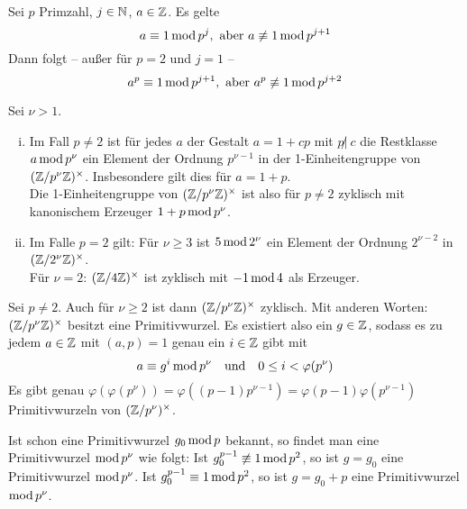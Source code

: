 \begin{lemma} \label{lemma_4.2}
	Sei $p$ Primzahl, $j \in \mathbb{N}$, $a \in \mathbb{Z}$. Es gelte
	\begin{equation}
		a \equiv 1 \operatorname{mod} p^j, \text{ aber } a \not\equiv 1 \operatorname{mod} p^{j+1} \label{eq_lemma_4.2_1}
	\end{equation}
	Dann folgt -- außer für $p=2$ und $j = 1$ --
	\begin{equation}
		a^p \equiv 1 \operatorname{mod} p^{j+1}, \text{ aber } a^p \not\equiv 1 \operatorname{mod} p^{j+2} \label{eq_lemma_4.2_2}
	\end{equation}
\end{lemma}

\begin{falko} \label{F4.4}
	Sei $\nu > 1$. \begin{enumerate}[(i)]
		\item Im Fall $p \neq 2$ ist für jedes $a$ der Gestalt $a = 1+cp$ mit $p \not | \ c$ die Restklasse $a \operatorname{mod} p^\nu$ ein Element der Ordnung $p^{\nu - 1}$ in der 1-Einheitengruppe von $(\mathbb{Z}/p^\nu\mathbb{Z})^\times$. Insbesondere gilt dies für $a = 1+p$. \\
		Die 1-Einheitengruppe von $(\mathbb{Z}/p^\nu\mathbb{Z})^\times$ ist also für $p \neq 2$ zyklisch mit kanonischem Erzeuger $1+p \operatorname{mod} p^\nu$.
		\item Im Falle $p=2$ gilt: Für $\nu \geq 3$ ist $5 \operatorname{mod} 2^\nu$ ein Element der Ordnung $2^{\nu-2}$ in $(\mathbb{Z}/2^\nu\mathbb{Z})^\times$. \\
		Für $\nu=2$: $(\mathbb{Z}/4\mathbb{Z})^\times$ ist zyklisch mit $-1 \operatorname{mod} 4$ als Erzeuger.
	\end{enumerate}
\end{falko}

\begin{satz} \label{satz_4.2}
	Sei $p \neq 2$. Auch für $\nu \geq 2$ ist dann $(\mathbb{Z}/p^\nu\mathbb{Z})^\times$ zyklisch. Mit anderen Worten: $(\mathbb{Z}/p^\nu\mathbb{Z})^\times$ besitzt eine Primitivwurzel. Es existiert also ein $g \in \mathbb{Z}$, sodass es zu jedem $a \in \mathbb{Z}$ mit $(a,p) = 1$ genau ein $i \in \mathbb{Z}$ gibt mit
	\[ a \equiv g^i \operatorname{mod} p^\nu \quad \text{und} \quad 0 \leq i < \varphi(p^\nu) \]
	Es gibt genau $\varphi(\varphi(p^\nu)) = \varphi((p-1)p^{\nu-1}) = \varphi(p-1) \varphi(p^{\nu-1})$ Primitivwurzeln von $(\mathbb{Z}/p^\nu)^\times$.
\end{satz}

	Ist schon eine Primitivwurzel $g_0 \operatorname{mod} p$ bekannt, so findet man eine Primitivwurzel $\operatorname{mod} p^\nu$ wie folgt: Ist $g_0^{p-1} \not\equiv 1 \operatorname{mod} p^2$, so ist $g = g_0$ eine Primitivwurzel $\operatorname{mod} p^\nu$. Ist $g_0^{p-1} \equiv 1 \operatorname{mod} p^2$, so ist $g = g_0 + p$ eine Primitivwurzel $\operatorname{mod} p^\nu$.
	
